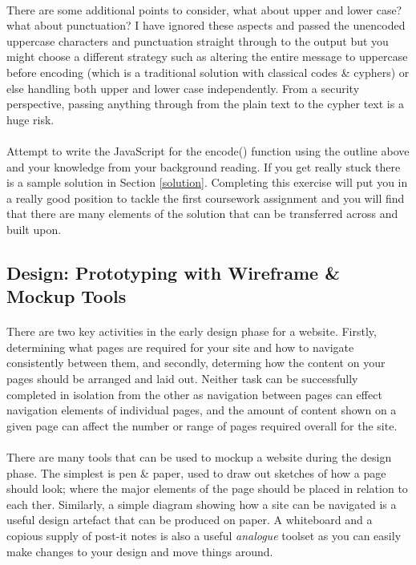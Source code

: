 \documentclass[10pt, a4paper, twosize]{article}
\begin{document}
\paragraph{} There are some additional points to consider, what about upper and lower case? what about punctuation? I have ignored these aspects and passed the unencoded uppercase characters and punctuation straight through to the output but you might choose a different strategy such as altering the entire message to uppercase before encoding (which is a traditional solution with classical codes \& cyphers) or else handling both upper and lower case independently. From a security perspective, passing anything through from the plain text to the cypher text is a huge risk.

\paragraph{} Attempt to write the JavaScript for the encode() function using the outline above and your knowledge from your background reading. If you get really stuck there is a sample solution in Section \ref{solution}. Completing this exercise will put you in a really good position to tackle the first coursework assignment and you will find that there are many elements of the solution that can be transferred across and built upon.

\subsection{Design: Prototyping with Wireframe \& Mockup Tools}
\paragraph{} There are two key activities in the early design phase for a website. Firstly, determining what pages are required for your site and how to navigate consistently between them, and secondly, determing how the content on your pages should be arranged and laid out. Neither task can be successfully completed in isolation from the other as navigation between pages can effect navigation elements of individual pages, and the amount of content shown on a given page can affect the number or range of pages required overall for the site.

\paragraph{} There are many tools that can be used to mockup a website during the design phase. The simplest is pen \& paper, used to draw out sketches of how a page should look; where the major elements of the page should be placed in relation to each ther. Similarly, a simple diagram showing how a site can be navigated is a useful design artefact that can be produced on paper. A whiteboard and a copious supply of post-it notes is also a useful \emph{analogue} toolset as you can easily make changes to your design and move things around.
\end{document}
